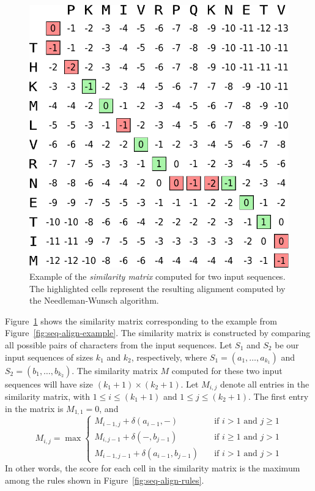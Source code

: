 \begin{figure}[h]
  \centering
  \includegraphics[scale=0.6]{src/background/figs/seq-align-example-nw}
  \caption{Example of the \textit{similarity matrix} computed for two input sequences.
           The highlighted cells represent the resulting alignment computed by the Needleman-Wunsch algorithm.}
  \label{fig:seq-align-example-nw}
\end{figure}

Figure~\ref{fig:seq-align-example-nw} shows the similarity matrix corresponding to the example from Figure~\ref{fig:seq-align-example}.
The similarity matrix is constructed by comparing all possible pairs of characters from the input sequences.
Let $S_1$ and $S_2$ be our input sequences of sizes $k_1$ and $k_2$, respectively, where $S_1 = (a_1,\ldots,a_{k_1})$ and $S_2 = (b_1,\ldots,b_{k_2})$.
The similarity matrix $M$ computed for these two input sequences will have size $(k_1 + 1) \times (k_2+1)$.
Let $M_{i,j}$ denote all entries in the similarity matrix, with $1 \leq i \leq (k_1 + 1)$ and $1 \leq j \leq (k_2 + 1)$.
The first entry in the matrix is $M_{1,1} = 0$, and
\begin{equation*}
M_{i,j} = \max \begin{cases}
  M_{i-1,j} + \delta(a_{i-1},-)         &  \quad  \text{if } i>1 \text{ and } j\geq1 \\
  M_{i,j-1} + \delta(-,b_{j-1})         &  \quad  \text{if } i\geq1 \text{ and } j>1 \\
  M_{i-1,j-1} + \delta(a_{i-1},b_{j-1}) &  \quad  \text{if } i>1 \text{ and } j>1
\end{cases}
\end{equation*}
In other words, the score for each cell in the similarity matrix is the maximum among the rules shown in Figure~\ref{fig:seq-align-rules}.

